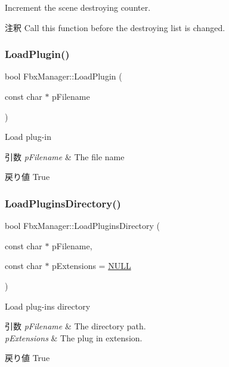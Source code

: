 Increment the scene destroying counter. \begin{DoxyRemark}{注釈}
Call this function before the destroying list is changed. 
\end{DoxyRemark}
\mbox{\label{class_fbx_manager_ae6c88deb7290a59dcf93ef6aaecd9a1c}} 
\subsubsection{\texorpdfstring{Load\+Plugin()}{LoadPlugin()}}
{\footnotesize\ttfamily bool Fbx\+Manager\+::\+Load\+Plugin (\begin{DoxyParamCaption}\item[{const char $\ast$}]{p\+Filename }\end{DoxyParamCaption})}

Load plug-\/in 
\begin{DoxyParams}{引数}
{\em p\+Filename} & The file name \\
\hline
\end{DoxyParams}
\begin{DoxyReturn}{戻り値}
{\ttfamily True} 
\end{DoxyReturn}
\mbox{\label{class_fbx_manager_a86e610934144baea58ef98f4b4968e2e}} 
\subsubsection{\texorpdfstring{Load\+Plugins\+Directory()}{LoadPluginsDirectory()}}
{\footnotesize\ttfamily bool Fbx\+Manager\+::\+Load\+Plugins\+Directory (\begin{DoxyParamCaption}\item[{const char $\ast$}]{p\+Filename,  }\item[{const char $\ast$}]{p\+Extensions = {\ttfamily \hyperlink{fbxarch_8h_a070d2ce7b6bb7e5c05602aa8c308d0c4}{N\+U\+LL}} }\end{DoxyParamCaption})}

Load plug-\/ins directory 
\begin{DoxyParams}{引数}
{\em p\+Filename} & The directory path. \\
\hline
{\em p\+Extensions} & The plug in extension. \\
\hline
\end{DoxyParams}
\begin{DoxyReturn}{戻り値}
{\ttfamily True} 
\end{DoxyReturn}
\mbox{\label{class_fbx_manager_abfc32a6436a410dbc2db564a73462c03}} 
